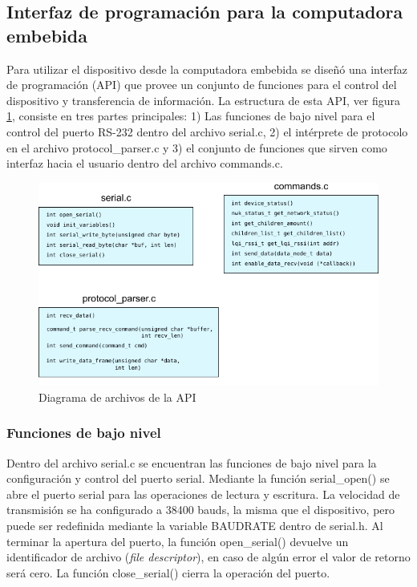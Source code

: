 \subsection{Interfaz de programación para la computadora embebida}

Para utilizar el dispositivo desde la computadora embebida se diseñó una interfaz de programación (API) que provee un conjunto de funciones para el control del dispositivo y transferencia de información. La estructura de esta API, ver figura \ref{fig:diagrama_api_archivos}, consiste en tres partes principales: 1) Las funciones de bajo nivel para el control del puerto RS-232 dentro del archivo serial.c, 2) el intérprete de protocolo en el archivo protocol\_parser.c y 3) el conjunto de funciones que sirven como interfaz hacia el usuario dentro del archivo commands.c.

\begin{figure}
	\centering
	\includegraphics[scale=1]{capitulo_3_imgs/api_estructura.pdf}
	\caption{Diagrama de archivos de la API}
	\label{fig:diagrama_api_archivos}
\end{figure}

\subsubsection{Funciones de bajo nivel}

Dentro del archivo serial.c se encuentran las funciones de bajo nivel para la configuración y control del puerto serial. Mediante la función serial\_open() se abre el puerto serial para las operaciones de lectura y escritura. La velocidad de transmisión se ha configurado a 38400 bauds, la misma que el dispositivo, pero puede ser redefinida mediante la variable BAUDRATE dentro de serial.h. 	Al terminar la apertura del puerto, la función open\_serial() devuelve un identificador de archivo (\textit{file descriptor}), en caso de alg\'un error el valor de retorno ser\'a cero. La función close\_serial() cierra la operación del puerto.

